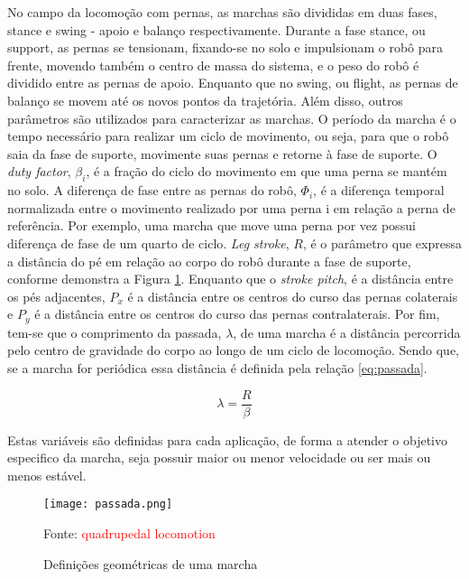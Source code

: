 \documentclass[../main.tex]{subfiles}
\begin{document}
  No campo da locomoção com pernas, as marchas são divididas em duas fases, stance e swing - apoio e balanço respectivamente. Durante a fase stance, ou  support, as pernas se tensionam, fixando-se no solo e impulsionam o robô para frente, movendo também o centro de massa do sistema, e o peso do robô é dividido entre as pernas de apoio. Enquanto que no swing, ou flight, as pernas de balanço se movem até os novos pontos da trajetória. Além disso, outros parâmetros são utilizados para caracterizar as marchas. O período da marcha é o tempo necessário para realizar um ciclo de movimento, ou seja, para que o robô saia da fase de suporte, movimente suas pernas e retorne à fase de suporte. O \textit{duty factor}, $\beta_i$, é a fração do ciclo do movimento em que uma perna se mantém no solo. A diferença de fase entre as pernas do robô, $\Phi_i$, é a diferença temporal normalizada entre o movimento realizado por uma perna i em relação a perna de referência. Por exemplo, uma marcha que move uma perna por vez possui diferença de fase de um quarto de ciclo. \textit{Leg stroke}, $R$, é o parâmetro que expressa a distância do pé em relação ao corpo do robô durante a fase de suporte, conforme demonstra a Figura \ref{fig:passada}. Enquanto que o \textit{stroke pitch}, é a distância entre os pés adjacentes, $P_x$ é a distância entre os centros do curso das pernas colaterais e $P_y$ é a distância entre os centros do curso das pernas contralaterais. Por fim, tem-se que o comprimento da passada, $\lambda$, de uma marcha é a distância percorrida pelo centro de gravidade do corpo ao longo de um ciclo de locomoção. Sendo que, se a marcha for periódica essa distância é definida pela relação \ref{eq:passada}.

  \begin{equation}
    \lambda=\frac{R}{\beta}
    \label{eq:passada}
  \end{equation}

  Estas variáveis são definidas para cada aplicação, de forma a atender o objetivo especifico da marcha, seja possuir maior ou menor velocidade ou ser mais ou menos estável.

  \begin{figure}[h]
    \centering
    \caption{Definições geométricas de uma marcha}
    \texttt{[image: passada.png]}
    
    Fonte: \textcolor{red}{quadrupedal locomotion}
    \label{fig:passada}
  \end{figure}
\end{document}
